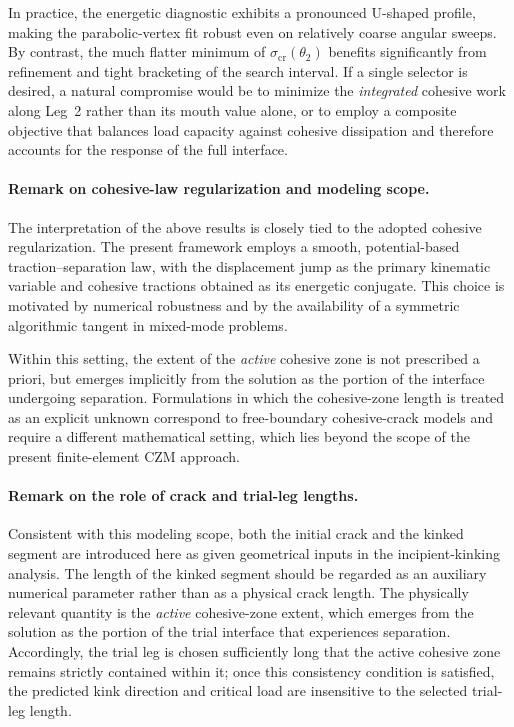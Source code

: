 \documentclass[smallextended]{svjour3}       %
\begin{document}
In practice, the energetic diagnostic exhibits a pronounced U-shaped profile,
making the parabolic-vertex fit robust even on relatively coarse angular
sweeps. By contrast, the much flatter minimum of
\(\sigma_{\mathrm{cr}}(\theta_2)\) benefits significantly from refinement and
tight bracketing of the search interval. If a single selector is desired, a
natural compromise would be to minimize the \emph{integrated} cohesive work
along Leg~2 rather than its mouth value alone, or to employ a composite
objective that balances load capacity against cohesive dissipation and
therefore accounts for the response of the full interface.

\paragraph{Remark on cohesive-law regularization and modeling scope.}
The interpretation of the above results is closely tied to the adopted
cohesive regularization. The present framework employs a smooth,
potential-based traction--separation law, with the displacement jump as the
primary kinematic variable and cohesive tractions obtained as its energetic
conjugate. This choice is motivated by numerical robustness and by the
availability of a symmetric algorithmic tangent in mixed-mode problems.

Within this setting, the extent of the \emph{active} cohesive zone is not
prescribed a priori, but emerges implicitly from the solution as the portion
of the interface undergoing separation. Formulations in which the
cohesive-zone length is treated as an explicit unknown correspond to
free-boundary cohesive-crack models and require a different mathematical
setting, which lies beyond the scope of the present finite-element CZM
approach.

\paragraph{Remark on the role of crack and trial-leg lengths.}
Consistent with this modeling scope, both the initial crack and the kinked
segment are introduced here as given geometrical inputs in the
incipient-kinking analysis. The length of the kinked segment should be
regarded as an auxiliary numerical parameter rather than as a physical crack
length. The physically relevant quantity is the \emph{active} cohesive-zone
extent, which emerges from the solution as the portion of the trial interface
that experiences separation. Accordingly, the trial leg is chosen
sufficiently long that the active cohesive zone remains strictly contained
within it; once this consistency condition is satisfied, the predicted kink
direction and critical load are insensitive to the selected trial-leg length.
\end{document}
